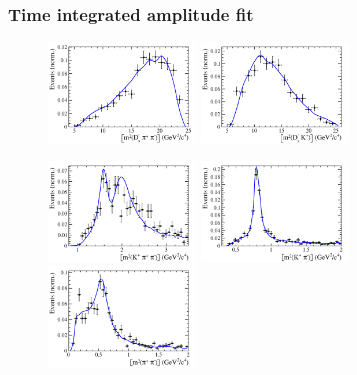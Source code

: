 \documentclass[]{beamer}
\begin{document}
\begin{frame}
	\frametitle{Time integrated amplitude fit}

	\centering
	
	\begin{figure}[hp]
	\centering
		\includegraphics[width=0.35\textwidth, height = 3.cm]{plots/s_Dspipi.pdf} 
		\includegraphics[width=0.35\textwidth, height = 3.cm]{plots/s_DsK.pdf} 

		\includegraphics[width=0.35\textwidth, height = 3.cm]{plots/s_Kpipi.pdf} 
		\includegraphics[width=0.35\textwidth, height = 3.cm]{plots/s_Kpi.pdf} 
		\includegraphics[width=0.35\textwidth, height = 3.cm]{plots/s_pipi.pdf} 		
	\end{figure}				
\end{frame}
\end{document}
